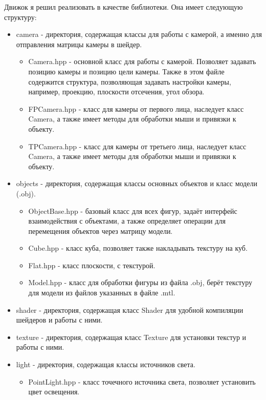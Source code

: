 \documentclass[12pt]{article}
\begin{document}
Движок я решил реализовать в качестве библиотеки. Она имеет следующую структуру:
\begin{itemize}
    \item camera - директория, содержащая классы для работы с камерой, а именно для отправления матрицы камеры в шейдер.
        \begin{itemize}
            \item Camera.hpp - основной класс для работы с камерой. Позволяет задавать позицию камеры и позицию цели камеры.
            Также в этом файле содержится структура, позволяющая задавать настройки камеры, например, проекцию, плоскости отсечения, угол обзора.
            \item FPCamera.hpp - класс для камеры от первого лица, наследует класс Camera, а также имеет методы для обработки мыши и привязки к объекту.
            \item TPCamera.hpp - класс для камеры от третьего лица, наследует класс Camera, а также имеет методы для обработки мыши и привязки к объекту.
        \end{itemize}
    \item objects - директория, содержащая классы основных объектов и класс модели (.obj).
        \begin{itemize}
            \item ObjectBase.hpp - базовый класс для всех фигур, задаёт интерфейс взаимодействия с объектами, а также определяет операции
            для перемещения объектов через матрицу модели.
            \item Cube.hpp - класс куба, позволяет также накладывать текстуру на куб.
            \item Flat.hpp - класс плоскости, с текстурой.
            \item Model.hpp - класс для обработки фигуры из файла .obj, берёт текстуру для модели из файлов указанных в файле .mtl.
        \end{itemize}
    \item shader - директория, содержащая класс Shader для удобной компиляции шейдеров и работы с ними.
    \item texture - директория, содержащая класс Texture для установки текстур и работы с ними.
    \item light - директория, содержащая классы источников света.
        \begin{itemize}
            \item PointLight.hpp - класс точечного источника света, позволяет установить цвет освещения.

\end{itemize}
\end{itemize}
\end{document}
